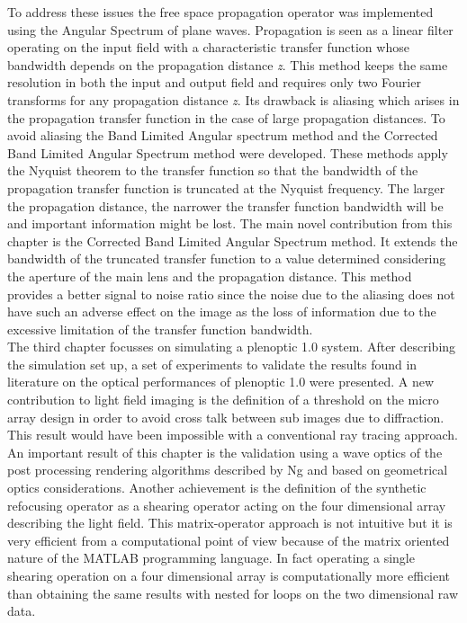 To address these issues the free space propagation operator was implemented using the Angular Spectrum of plane waves. Propagation is seen as a linear filter operating on the input field with a characteristic transfer function whose bandwidth depends on the propagation distance \textit{z}. This method keeps the same resolution in both the input and output field and requires only two Fourier transforms for any propagation distance \textit{z}. Its drawback is aliasing which arises in the propagation transfer function in the case of large propagation distances. To avoid aliasing the Band Limited Angular spectrum method and the Corrected Band Limited Angular Spectrum method were developed. These methods apply the Nyquist theorem to the transfer function so that the bandwidth of the propagation transfer function is truncated at the Nyquist frequency. The larger the propagation distance, the narrower the transfer function bandwidth will be and important information might be lost. The main novel contribution from this chapter is the Corrected Band Limited Angular Spectrum method. It extends the bandwidth of the truncated transfer function to a value determined considering the aperture of the main lens and the propagation distance. This method provides a better signal to noise ratio since the noise due to the aliasing does not have such an adverse effect on the image as the loss of information due to the excessive limitation of the transfer function bandwidth.
\\ 
The third chapter focusses on simulating a plenoptic 1.0 system. After describing the simulation set up, a set of experiments to validate the results found in literature on the optical performances of plenoptic 1.0 were presented. A new contribution to light field imaging is the definition of a threshold on the micro array design in order to avoid cross talk between sub images due to diffraction. This result would have been impossible with a conventional ray tracing approach. An important result of this chapter is the validation using a wave optics of the post processing rendering algorithms described by Ng \cite{ng2006digital} and based on geometrical optics considerations. Another achievement is the definition of the synthetic refocusing operator as a shearing operator acting on the four dimensional array describing the light field. This matrix-operator approach is not intuitive but it is very efficient from a computational point of view because of the matrix oriented nature of the MATLAB programming language. In fact operating a single shearing operation on a four dimensional array is computationally more efficient than obtaining the same results with nested for loops on the two dimensional raw data.\\
